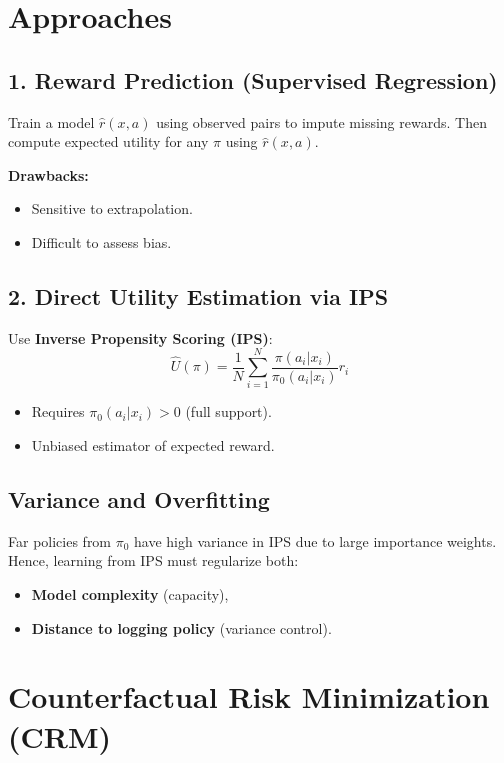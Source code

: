\documentclass[11pt]{article}
\begin{document}
\section{Approaches}

\subsection{1. Reward Prediction (Supervised Regression)}

Train a model $\hat{r}(x, a)$ using observed pairs to impute missing rewards. Then compute expected utility for any $\pi$ using $\hat{r}(x, a)$.

\textbf{Drawbacks:}
\begin{itemize}
  \item Sensitive to extrapolation.
  \item Difficult to assess bias.
\end{itemize}

\subsection{2. Direct Utility Estimation via IPS}

Use \textbf{Inverse Propensity Scoring (IPS)}:
\[
\hat{U}(\pi) = \frac{1}{N} \sum_{i=1}^N \frac{\pi(a_i|x_i)}{\pi_0(a_i|x_i)} r_i
\]
\begin{itemize}
  \item Requires $\pi_0(a_i|x_i) > 0$ (full support).
  \item Unbiased estimator of expected reward.
\end{itemize}

\subsection*{Variance and Overfitting}
Far policies from $\pi_0$ have high variance in IPS due to large importance weights. Hence, learning from IPS must regularize both:
\begin{itemize}
  \item \textbf{Model complexity} (capacity),
  \item \textbf{Distance to logging policy} (variance control).
\end{itemize}

\section{Counterfactual Risk Minimization (CRM)}
\end{document}
